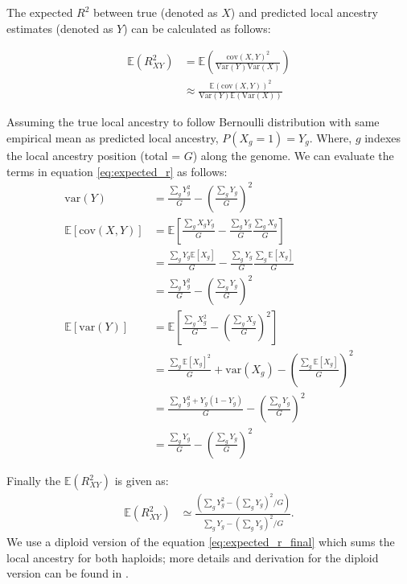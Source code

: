 The expected $R^2$ between true (denoted as $X$) and predicted local ancestry estimates (denoted as $Y$) can be calculated as follows:

\begin{align}
    \mathbb{E}(R^2_{XY}) &= \mathbb{E} \left( \frac{\text{cov}(X, Y)^2}{\text{Var}(Y) \text{Var}(X)} \right) \\
              &\approx \frac{\mathbb{E}(\text{cov}(X, Y))^2}{\text{Var}(Y) \mathbb{E}(\text{Var}(X))}
\label{eq:expected_r}
\end{align}

Assuming the true local ancestry to follow Bernoulli distribution with same empirical mean as predicted local ancestry, $P(X_g = 1) = Y_g$. Where, $g$ indexes the local ancestry position (total = $G$) along the genome. We can evaluate the terms in equation \ref{eq:expected_r} as follows:
\begin{align}
\text{var}(Y) &= \frac{\sum_g Y_{g}^2}{G} - \left( \frac{\sum_g Y_{g}}{G} \right)^2 \nonumber \\ 
\mathbb{E}[\text{cov}(X, Y)] &= \mathbb{E} \left[ \frac{\sum_g X_{g} Y_{g}}{G} - \frac{\sum_g Y_{g}}{G} \frac{\sum_g X_{g}}{G} \right] \nonumber  \\
&= \frac{\sum_g Y_{g} \mathbb{E}[X_{g}]}{G} - \frac{\sum_g Y_{g}}{G} \frac{\sum_g \mathbb{E}[X_{g}]}{G} \nonumber \\
&= \frac{\sum_g Y_{g}^2}{G} - \left( \frac{\sum_g Y_{g}}{G} \right)^2 \nonumber \\
\mathbb{E}[\text{var}(Y)] &= \mathbb{E} \left[ \frac{\sum_g X_{g}^2}{G} - \left( \frac{\sum_g X_{g}}{G} \right)^2 \right] \nonumber  \\
&= \frac{\sum_g \mathbb{E}[X_{g}]^2}{G} + \text{var}(X_{g}) - \left( \frac{\sum_g \mathbb{E}[X_{g}]}{G} \right)^2 \nonumber  \\
&= \frac{\sum_g Y_{g}^2 + Y_{g} (1 - Y_{g})}{G} - \left( \frac{\sum_g Y_{g}}{G} \right)^2 \nonumber  \\
&= \frac{\sum_g Y_{g}}{G} - \left( \frac{\sum_g Y_{g}}{G} \right)^2
\end{align}

Finally the $\mathbb{E}(R^2_{XY})$ is given as:
\begin{align}
    \mathbb{E}(R^2_{XY}) &\simeq \frac{\left( \sum_g Y_{g}^2 - \left( \sum_g Y_{g} \right)^2/G \right)}{\sum_g Y_{g} - \left( \sum_g Y_{g} \right)^2/G}.
\label{eq:expected_r_final}
\end{align}
We use a diploid version of the equation \ref{eq:expected_r_final} which sums the local ancestry for both haploids; more details and derivation for the diploid version can be found in \cite{salter2019fine}. 


